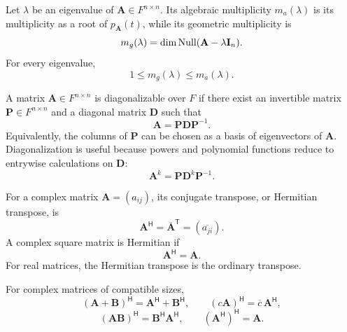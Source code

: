     \begin{definition}
        Let $\lambda$ be an eigenvalue of $\mathbf{A}\in F^{n\times n}$.
        Its algebraic multiplicity $m_a(\lambda)$ is its multiplicity as a root
        of $p_{\mathbf{A}}(t)$, while its geometric multiplicity is
        \[
            m_g(\lambda)
            =
            \dim\operatorname{Null}(\mathbf{A}-\lambda\mathbf{I}_n).
        \]
        For every eigenvalue,
        \[
            1\leq m_g(\lambda)\leq m_a(\lambda).
        \]
    \end{definition}

    \begin{definition}
        A matrix $\mathbf{A}\in F^{n\times n}$ is diagonalizable over $F$ if
        there exist an invertible matrix $\mathbf{P}\in F^{n\times n}$ and a
        diagonal matrix $\mathbf{D}$ such that
        \[
            \mathbf{A}=\mathbf{P}\mathbf{D}\mathbf{P}^{-1}.
        \]
        Equivalently, the columns of $\mathbf{P}$ can be chosen as a basis of
        eigenvectors of $\mathbf{A}$. Diagonalization is useful because powers
        and polynomial functions reduce to entrywise calculations on
        $\mathbf{D}$:
        \[
            \mathbf{A}^k=\mathbf{P}\mathbf{D}^k\mathbf{P}^{-1}.
        \]
    \end{definition}

    \begin{definition}
        For a complex matrix $\mathbf{A}=(a_{ij})$, its conjugate transpose, or
        Hermitian transpose, is
        \[
            \mathbf{A}^{\mathsf H}
            =
            \overline{\mathbf{A}}^{\mathsf T}
            =
            (\overline{a_{ji}}).
        \]
        A complex square matrix is Hermitian if
        \[
            \mathbf{A}^{\mathsf H}=\mathbf{A}.
        \]
        For real matrices, the Hermitian transpose is the ordinary transpose.
    \end{definition}

    \begin{proposition}
        For complex matrices of compatible sizes,
        \[
            (\mathbf{A}+\mathbf{B})^{\mathsf H}
            =
            \mathbf{A}^{\mathsf H}+\mathbf{B}^{\mathsf H},
            \qquad
            (c\mathbf{A})^{\mathsf H}
            =
            \overline{c}\,\mathbf{A}^{\mathsf H},
        \]
        \[
            (\mathbf{A}\mathbf{B})^{\mathsf H}
            =
            \mathbf{B}^{\mathsf H}\mathbf{A}^{\mathsf H},
            \qquad
            (\mathbf{A}^{\mathsf H})^{\mathsf H}
            =
            \mathbf{A}.
        \]
    \end{proposition}

